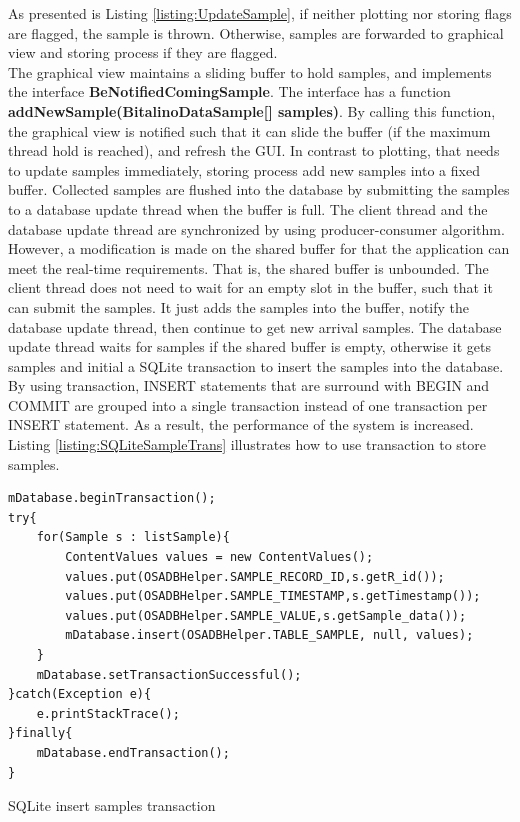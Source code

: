 As presented is Listing \ref{listing:UpdateSample}, if neither plotting nor storing flags are flagged, the sample is thrown. Otherwise, samples are forwarded to graphical view and storing process if they are flagged.\\The graphical view maintains a sliding buffer to hold samples, and implements the interface \textbf{BeNotifiedComingSample}. The interface has a function \textbf{addNewSample(BitalinoDataSample[] samples)}. By calling this function, the graphical view is notified such that it can slide the buffer (if the maximum thread hold is reached), and refresh the GUI. In contrast to plotting, that needs to update samples immediately, storing process add new samples into a fixed buffer. Collected samples are flushed into the database by submitting the samples to a database update thread when the buffer is full. The client thread and the database update thread are synchronized by using producer-consumer algorithm\cite{CONSUMERPRODUCER}. However, a modification is made on the shared buffer for that the application can meet the real-time requirements. That is, the shared buffer is unbounded. The client thread does not need to wait for an empty slot in the buffer, such that it can submit the samples. It just adds the samples into the buffer, notify the database update thread, then continue to get new arrival samples. The database update thread waits for samples if the shared buffer is empty, otherwise it gets samples and initial a SQLite transaction to insert the samples into the database. By using transaction, INSERT statements that are surround with BEGIN and COMMIT are grouped into a single transaction instead of one transaction per INSERT statement. As a result, the performance of the system is increased. Listing \ref{listing:SQLiteSampleTrans} illustrates how to use transaction to store samples.
\begin{code}[ht]
\begin{lstlisting}
mDatabase.beginTransaction();
try{
    for(Sample s : listSample){
        ContentValues values = new ContentValues();
        values.put(OSADBHelper.SAMPLE_RECORD_ID,s.getR_id());
        values.put(OSADBHelper.SAMPLE_TIMESTAMP,s.getTimestamp());
        values.put(OSADBHelper.SAMPLE_VALUE,s.getSample_data());
        mDatabase.insert(OSADBHelper.TABLE_SAMPLE, null, values);
    }
    mDatabase.setTransactionSuccessful();
}catch(Exception e){
    e.printStackTrace();
}finally{
    mDatabase.endTransaction();
}
\end{lstlisting}
\caption[SQLite insert samples transaction]{SQLite insert samples transaction}
\label{listing:SQLiteSampleTrans}
\end{code}
